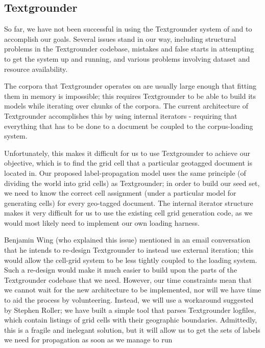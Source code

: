 
\subsection{Textgrounder}
So far, we have not been successful in using the Textgrounder system of 
 and  to accomplish our goals. 
Several issues stand in our way, including structural problems in the
Textgrounder codebase, mistakes and false starts in attempting to get
the system up and running, and various problems involving dataset and resource
availability.
\par
The corpora that Textgrounder operates on are usually large enough that fitting them
in memory is impossible; this requires Textgrounder to be able to
build its models while iterating over chunks of the corpora.
The current architecture of Textgrounder accomplishes this by using internal
iterators - requiring that everything that has to be done to a document be
coupled to the corpus-loading system.
\par
Unfortunately, this makes it difficult for us to use Textgrounder to achieve
our objective, which is to find the grid cell that a particular geotagged document is located in.
Our proposed label-propagation model uses the same principle (of dividing the
world into grid cells) as Textgrounder; in order to build our seed set, we need to
know the correct cell assignment (under a particular model for generating
cells) for every geo-tagged document.
The internal iterator structure makes it very difficult for us to use the
existing cell grid generation code, as we would most likely need to implement our own
loading harness.
\par
Benjamin Wing (who explained this issue) mentioned in an email conversation that he intends to re-design
Textgrounder to instead use external iteration; this would allow the cell-grid
system to be less tightly coupled to the loading system.
Such a re-design would make it much easier to build upon the parts of the
Textgrounder codebase that we need. However, our time constraints mean that we cannot 
wait for the new architecture to be implemented, nor will we have
time to aid the process by volunteering.
Instead, we will use a workaround suggested by Stephen Roller; we have built a
simple tool that parses Textgrounder logfiles, which contain listings of grid
cells with their geographic boundaries.
Admittedly, this is a fragile and inelegant solution, but it will allow us to
get the sets of labels we need for propagation as soon as we manage to run
